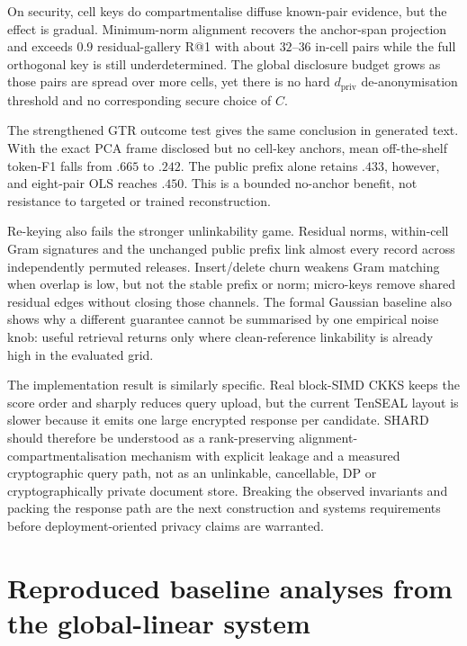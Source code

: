 \documentclass[11pt,a4paper]{article}
\begin{document}
On security, cell keys do compartmentalise diffuse known-pair evidence, but
the effect is gradual. Minimum-norm alignment recovers the anchor-span
projection and exceeds $0.9$ residual-gallery R@1 with about $32$--$36$
in-cell pairs while the full orthogonal key is still underdetermined. The
global disclosure budget grows as those pairs are spread over more cells,
yet there is no hard $d_{\mathrm{priv}}$ de-anonymisation threshold and no
corresponding secure choice of $C$.

The strengthened GTR outcome test gives the same conclusion in generated
text. With the exact PCA frame disclosed but no cell-key anchors, mean
off-the-shelf token-F1 falls from $.665$ to $.242$. The public prefix alone
retains $.433$, however, and eight-pair OLS reaches $.450$. This is a bounded
no-anchor benefit, not resistance to targeted or trained reconstruction.

Re-keying also fails the stronger unlinkability game. Residual norms,
within-cell Gram signatures and the unchanged public prefix link almost every
record across independently permuted releases. Insert/delete churn weakens
Gram matching when overlap is low, but not the stable prefix or norm;
micro-keys remove shared residual edges without closing those channels. The
formal Gaussian baseline also shows why a different guarantee cannot be
summarised by one empirical noise knob: useful retrieval returns only where
clean-reference linkability is already high in the evaluated grid.

The implementation result is similarly specific. Real block-SIMD CKKS keeps
the score order and sharply reduces query upload, but the current TenSEAL
layout is slower because it emits one large encrypted response per candidate.
SHARD should therefore be understood as a rank-preserving
alignment-compartmentalisation mechanism with explicit leakage and a measured
cryptographic query path, not as an unlinkable, cancellable, DP or
cryptographically private document store. Breaking the observed invariants
and packing the response path are the next construction and systems
requirements before deployment-oriented privacy claims are warranted.

\appendix
\section{Reproduced baseline analyses from the global-linear system}\label{app:baseline}\label{ssec:vec2text}\label{app:projbaselines}\label{app:noise}\label{ssec:adaptive-inversion}
\end{document}
